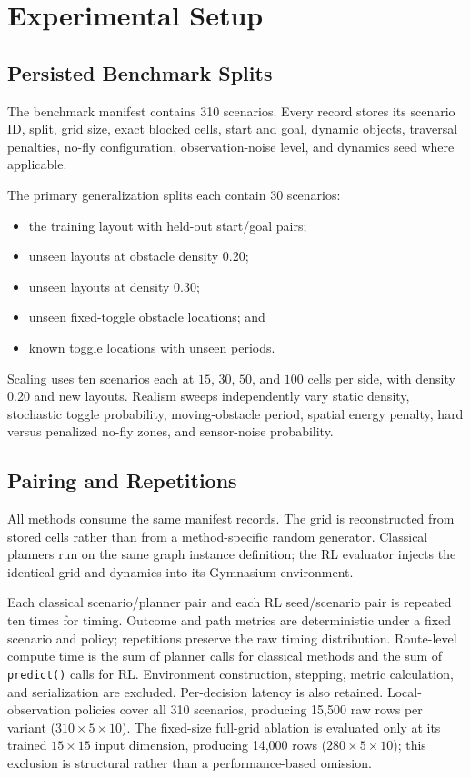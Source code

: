 \section{Experimental Setup}
\label{sec:experimental-setup}

\subsection{Persisted Benchmark Splits}

The benchmark manifest contains 310 scenarios. Every record stores its scenario
ID, split, grid size, exact blocked cells, start and goal, dynamic objects,
traversal penalties, no-fly configuration, observation-noise level, and
dynamics seed where applicable.

The primary generalization splits each contain 30 scenarios:
\begin{itemize}
    \item the training layout with held-out start/goal pairs;
    \item unseen layouts at obstacle density 0.20;
    \item unseen layouts at density 0.30;
    \item unseen fixed-toggle obstacle locations; and
    \item known toggle locations with unseen periods.
\end{itemize}

Scaling uses ten scenarios each at $15$, $30$, $50$, and $100$ cells per side,
with density 0.20 and new layouts. Realism sweeps independently vary static
density, stochastic toggle probability, moving-obstacle period, spatial energy
penalty, hard versus penalized no-fly zones, and sensor-noise probability.

\subsection{Pairing and Repetitions}

All methods consume the same manifest records. The grid is reconstructed from
stored cells rather than from a method-specific random generator. Classical
planners run on the same graph instance definition; the RL evaluator injects
the identical grid and dynamics into its Gymnasium environment.

Each classical scenario/planner pair and each RL
seed/scenario pair is repeated ten times for timing. Outcome and path metrics
are deterministic under a fixed scenario and policy; repetitions preserve the
raw timing distribution. Route-level compute time is the sum of planner calls
for classical methods and the sum of \texttt{predict()} calls for RL.
Environment construction, stepping, metric calculation, and serialization are
excluded. Per-decision latency is also retained.
Local-observation policies cover all 310 scenarios, producing 15,500 raw rows
per variant ($310\times5\times10$). The fixed-size full-grid ablation is
evaluated only at its trained $15\times15$ input dimension, producing 14,000
rows ($280\times5\times10$); this exclusion is structural rather than a
performance-based omission.

